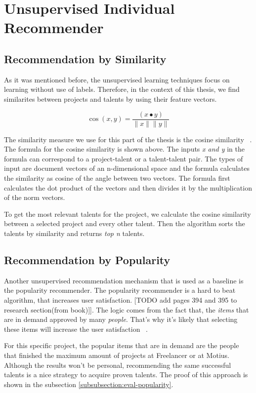 \section{Unsupervised Individual Recommender}

\subsection{Recommendation by Similarity}

As it was mentioned before, the unsupervised learning techniques focus on  learning without use of labels. Therefore, in the context of this thesis, we find similarites between projects and talents by using their feature vectors. 


\begin{equation}
\cos (x, y)=\frac{(x \bullet y)}{\|x\|\|y\|}
\end{equation}


The similarity measure we use for this part of the thesis is the cosine similarity ~\parencite{amatriain2011data}. The formula for the cosine similarity is shown above. The inputs  \textit{x and y} in the formula can correspond to a project-talent or a talent-talent pair. The types of input are document vectors of an n-dimensional space and the formula calculates the similarity as cosine of the angle between two vectors. The formula first calculates the dot product of the vectors and then divides it by the multiplication of the norm vectors.


To get the most relevant talents for the project, we calculate the cosine similarity between a selected project and every other talent. Then the algorithm sorts the talents by similarity and returns \textit{top n} talents.


\subsection{Recommendation by Popularity}


Another unsupervised recommendation mechanism that is used as a baseline is the popularity recommender. The popularity recommender is a hard to beat algorithm, that increases user satisfaction. [TODO add pages 394 and 395 to research section(from book)]]. The logic comes from the fact that, the \textit{items} that are in demand approved by many \textit{people}. That's why it's likely that selecting these items will increase the user satisfaction ~\parencite{amatriain2015recommender}. 


For this specific project, the popular items that are in demand are the people that finished the maximum amount of projects at Freelancer or at Motius. Although the results won't be personal, recommending the same successful talents is a nice strategy to acquire proven talents. The proof of this approach is shown in the subsection \ref{subsubsection:eval-popularity}.

